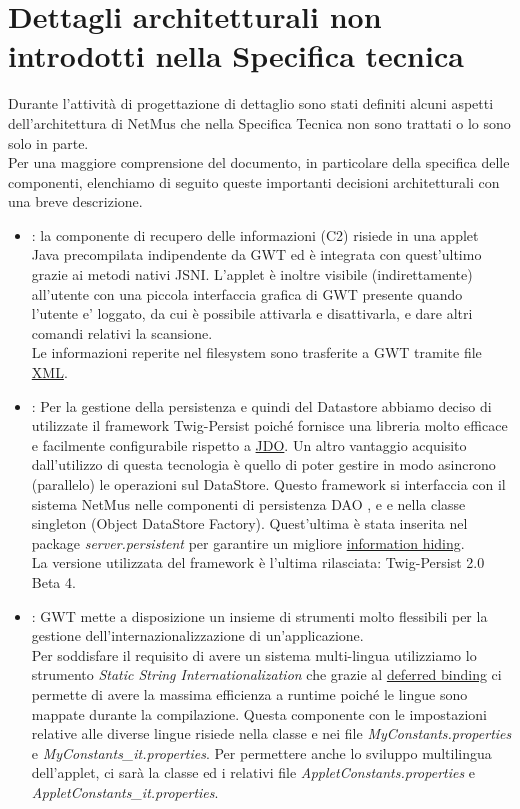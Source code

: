 \chapter{Dettagli architetturali non introdotti nella Specifica tecnica}
\thispagestyle{fancy} 
Durante l'attivit\`a di progettazione di dettaglio sono stati definiti alcuni
aspetti dell'architettura di NetMus che nella Specifica Tecnica non sono
trattati o lo sono solo in parte.\\ Per una maggiore comprensione del documento,
in particolare della specifica delle componenti, elenchiamo di seguito queste
importanti decisioni architetturali con una breve descrizione.
\begin{itemize}
  \item {} : la componente di recupero delle informazioni (C2) risiede
  in una applet\\Java precompilata indipendente da GWT ed \`e integrata con
  quest'ultimo grazie ai metodi nativi JSNI. L'applet \`e inoltre visibile
  (indirettamente) all'utente con una piccola interfaccia grafica di GWT
  presente quando l'utente e' loggato, da cui \`e possibile
  attivarla e disattivarla, e dare altri comandi relativi la scansione.\\ Le
  informazioni reperite nel filesystem sono trasferite a GWT tramite file
  \underline{XML}.
  
  \item {} : Per la gestione della persistenza e
  quindi del Datastore abbiamo deciso di utilizzate il framework Twig-Persist poich\'e
  fornisce una libreria molto efficace e facilmente configurabile
  rispetto a \underline{JDO}. Un altro vantaggio acquisito dall'utilizzo di
  questa tecnologia \`e quello di poter gestire in modo asincrono (parallelo) le
  operazioni sul DataStore. Questo framework si interfaccia con il sistema
  NetMus nelle componenti di persistenza DAO ,  e
   e nella classe singleton  (Object DataStore
  Factory). Quest'ultima \`e stata inserita nel package \emph{server.persistent}
  per garantire un migliore \underline{information hiding}. \\
  La versione utilizzata del framework \`e l'ultima rilasciata: Twig-Persist 2.0
  Beta 4.
  
  \item {} : GWT mette a disposizione un insieme di
  strumenti molto flessibili per la gestione dell'internazionalizzazione di
  un'applicazione.\\ Per soddisfare il requisito di avere un sistema
  multi-lingua utilizziamo lo strumento \emph{Static String
  Internationalization} che grazie al \underline{deferred binding} ci permette
  di avere la massima efficienza a runtime poich\'e le lingue sono mappate durante la
  compilazione. Questa componente con le impostazioni relative alle
  diverse lingue risiede nella classe  e nei file
  \emph{MyConstants.properties} e \emph{MyConstants\_it.properties}. Per
  permettere anche lo sviluppo multilingua dell'applet, ci sar\`a la classe
   ed i relativi file \emph{AppletConstants.properties} e
  \emph{AppletConstants\_it.properties}.
  

\end{itemize}
